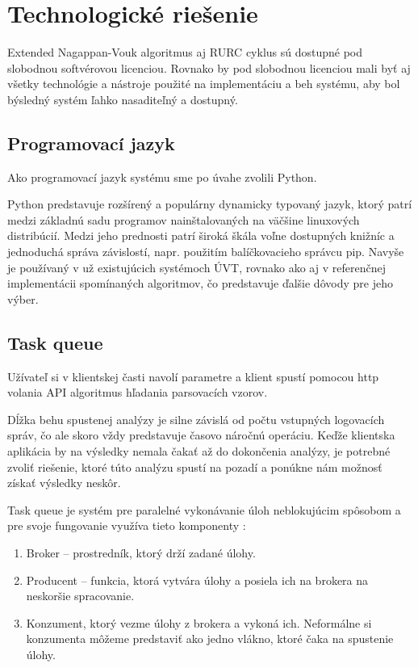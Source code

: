 \section{Technologické riešenie}

Extended Nagappan-Vouk algoritmus aj RURC cyklus sú dostupné pod slobodnou softvérovou licenciou. Rovnako by pod slobodnou licenciou mali byť aj všetky technológie a nástroje použité na implementáciu a beh systému, aby bol býsledný systém ľahko nasaditeľný a dostupný.


\subsection{Programovací jazyk}
Ako programovací jazyk systému sme po úvahe zvolili Python. 
\par Python predstavuje rozšírený a populárny dynamicky typovaný jazyk, ktorý patrí medzi základnú sadu programov nainštalovaných na väčšine linuxových distribúcií. Medzi jeho prednosti patrí široká škála voľne dostupných knižníc a jednoduchá správa závislostí, napr. použitím balíčkovacieho správcu pip. Navyše je používaný v už existujúcich systémoch ÚVT, rovnako ako aj v referenčnej implementácii spomínaných algoritmov, čo predstavuje ďalšie dôvody pre jeho výber. 

\subsection{Task queue}
Užívateľ si v klientskej časti navolí parametre a klient spustí pomocou http volania API algoritmus hľadania parsovacích vzorov.
\par Dĺžka behu spustenej analýzy je silne závislá od počtu vstupných logovacích správ, čo ale skoro vždy predstavuje časovo náročnú operáciu. Keďže klientska aplikácia by na výsledky nemala čakať až do dokončenia analýzy, je potrebné zvoliť riešenie, ktoré túto analýzu spustí na pozadí a ponúkne nám možnosť získať výsledky neskôr.
\par Task queue je systém pre paralelné vykonávanie úloh neblokujúcim spôsobom a pre svoje fungovanie využíva tieto komponenty :

\begin{enumerate}
  \item Broker -- prostredník, ktorý drží zadané úlohy.
  \item Producent -- funkcia, ktorá vytvára úlohy a posiela ich na brokera na neskoršie spracovanie.
  \item Konzument, ktorý vezme úlohy z brokera a vykoná ich. Neformálne si konzumenta môžeme predstaviť ako jedno vlákno, ktoré čaka na spustenie úlohy.
\end{enumerate}

